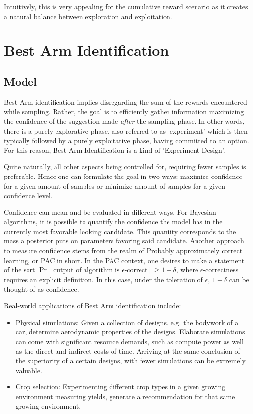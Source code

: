 Intuitively, this is very appealing for the cumulative reward scenario as it creates a natural balance between exploration and exploitation.

\section{Best Arm Identification}
\subsection{Model}\label{ss:top-1_model}

Best Arm identification implies disregarding the sum of the rewards encountered while sampling. Rather, the goal is to efficiently gather information maximizing the confidence of the suggestion made \emph{after} the sampling phase. In other words, there is a purely explorative phase, also referred to as 'experiment' which is then typically followed by a purely exploitative phase, having committed to an option. For this reason, Best Arm Identification is a kind of 'Experiment Design'.

Quite naturally, all other aspects being controlled for, requiring fewer samples is preferable. Hence one can formulate the goal in two ways: maximize confidence for a given amount of samples or minimize amount of samples for a given confidence level.

Confidence can mean and be evaluated in different ways. For Bayesian algorithms, it is possible to quantify the confidence the model has in the currently most favorable looking candidate. This quantity corresponds to the mass a posterior puts on parameters favoring said candidate. Another approach to measure confidence stems from the realm of Probably approximately correct learning, or PAC in short. In the PAC context, one desires to make a statement of the sort $\Pr[\text{output of algorithm is $\epsilon$-correct}] \geq 1 - \delta$, where $\epsilon$-correctness requires an explicit definition. In this case, under the toleration of $\epsilon$, $1 - \delta$ can be thought of as confidence.

Real-world applications of Best Arm identification include:
\begin{itemize}
  \item Physical simulations: Given a collection of designs, e.g. the bodywork of a car, determine aerodynamic properties of the designs. Elaborate simulations can come with significant resource demands, such as compute power as well as the direct and indirect costs of time. Arriving at the same conclusion of the superiority of a certain designs, with fewer simulations can be extremely valuable.
  \item Crop selection: Experimenting different crop types in a given growing environment measuring yields, generate a recommendation for that same growing environment.
\end{itemize}

